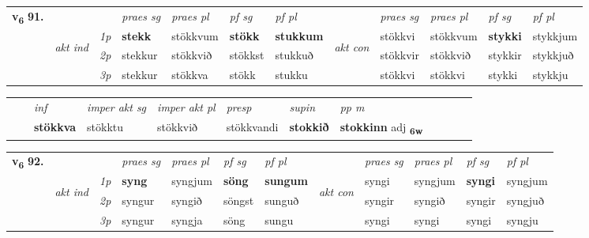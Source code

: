 \begin{tabular}{llllllllllll} \toprule
\multirow{4}{*}{{{\textbf{v{\textsubscript{6}}} \Large{\textbf{91.}}}}}  & &   &  \textit{praes sg}  & \textit{praes pl}  &\textit{ pf sg} & \textit{pf pl} &  &  \textit{praes sg}  & \textit{praes pl}  & \textit{pf sg} & \textit{pf pl } \\*
	\cmidrule{4-7} \cmidrule{9-12}
 & \multirow{3}{*}{\begin{turn}{90}\textit{akt ind}\end{turn}} & {\textit{1p}} & \textbf{stekk} & stökkvum    & \textbf{stökk} & \textbf{stukkum} & \multirow{3}{*}{\begin{turn}{90}\textit{akt con}\end{turn}} &stökkvi & stökkvum & \textbf{stykki} & stykkjum\\*
& &  {\textit{2p}} &  stekkur  & stökkvið   & stökkst & stukkuð & & stökkvir & stökkvið & stykkir & stykkjuð \\*
& &  {\textit{3p}} & stekkur & stökkva   & stökk & stukku & & stökkvi & stökkvi& stykki & stykkju  \\*
\cmidrule{4-7} \cmidrule{9-12}
\end{tabular}


\begin{tabular}{llllllllllll}
 & & \textit{inf} & \textit{imper akt sg} & \textit{imper akt pl}   & \textit{presp} & \textit{supin}  & \textit{pp m}     \\*
  & & \textbf{stökkva} & stökktu  & stökkvið   & stökkvandi &  \textbf{stokkið}  & \textbf{stokkinn} adj \textbf{\textsubscript{6w}} \\*
\cmidrule{1-12}
\end{tabular}



\begin{tabular}{llllllllllll} \toprule
\multirow{4}{*}{{{\textbf{v{\textsubscript{6}}} \Large{\textbf{92.}}}}}  & &   &  \textit{praes sg}  & \textit{praes pl}  &\textit{ pf sg} & \textit{pf pl} &  &  \textit{praes sg}  & \textit{praes pl}  & \textit{pf sg} & \textit{pf pl } \\*
	\cmidrule{4-7} \cmidrule{9-12}
 & \multirow{3}{*}{\begin{turn}{90}\textit{akt ind}\end{turn}} & {\textit{1p}} & \textbf{syng} & syngjum    & \textbf{söng} & \textbf{sungum} & \multirow{3}{*}{\begin{turn}{90}\textit{akt con}\end{turn}} &syngi & syngjum & \textbf{syngi} & syngjum\\*
& &  {\textit{2p}} &  syngur  & syngið   & söngst & sunguð & & syngir & syngið & syngir & syngjuð \\*
& &  {\textit{3p}} & syngur & syngja   & söng & sungu & & syngi & syngi& syngi & syngju  \\*
\cmidrule{4-7} \cmidrule{9-12}
\end{tabular}


